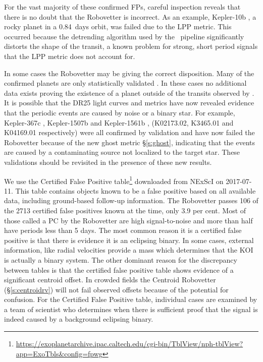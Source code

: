 For the vast majority of these confirmed FPs, careful inspection reveals that there is no doubt that the Robovetter is incorrect. As an example, Kepler-10b \citep[][]{Batalha2011Kepler10,Fogtmann2014Kepler10}, a rocky planet in a 0.84~days orbit, was failed due to the LPP metric. This occurred because the detrending algorithm used by the \Kepler\ pipeline significantly distorts the shape of the transit, a known problem for strong, short period signals \citep{Christiansen2015} that the LPP metric does not account for.

In some cases the Robovetter may be giving the correct disposition.  Many of the confirmed planets are only statistically validated \citep{Morton2016,Rowe2014}. In these cases no additional data exists proving the existence of a planet outside of the transits observed by \Kepler. It is possible that the DR25 light curves and metrics have now revealed evidence that the periodic events are caused by noise or a binary star. For example, Kepler-367c \citep{Rowe2014}, Kepler-1507b \citep{Morton2016} and Kepler-1561b \citep{Morton2016}, (K02173.02, K3465.01 and K04169.01 respectively) were all confirmed by validation and have now failed the Robovetter because of the new ghost metric \S\ref{s:ghost}, indicating that the events are caused by a contaminating source not localized to the target star.  These validations should be revisited in the presence of these new results.


We use the Certified False Positive table\footnote{\url{https://exoplanetarchive.ipac.caltech.edu/cgi-bin/TblView/nph-tblView?app=ExoTbls\&config=fpwg}} downloaded from NExScI on 2017-07-11. This table contains objects known to be a false positive based on all available data, including ground-based follow-up information.  The Robovetter passes 106 of the 2713 certified false positives known at the time, only 3.9 per cent.  Most of those called a PC by the Robovetter are high signal-to-noise and more than half have periods less than 5 days.  The most common reason it is a certified false positive is that there is evidence it is an eclipsing binary. In some cases, external information, like radial velocities provide a mass which determines that the KOI is actually a binary system. The other dominant reason for the discrepancy between tables is that the certified false positive table shows evidence of a significant centroid offset. In crowded fields the Centroid Robovetter (\S\ref{s:centroidrv}) will not fail observed offsets because of the potential for confusion. For the Certified False Positive table, individual cases are examined by a team of scientist who determines when there is sufficient proof that the signal is indeed caused by a background eclipsing binary.  

